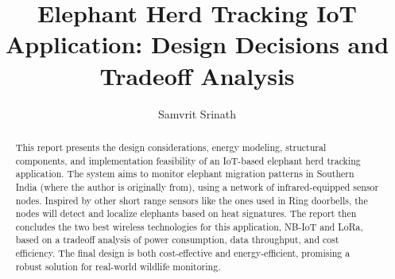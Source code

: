 \documentclass[sigconf,letterpaper,10pt,nonacm]{acmart}
\begin{document}
\title{Elephant Herd Tracking IoT Application: Design Decisions and Tradeoff Analysis}
\author{Samvrit Srinath}

\begin{abstract}
    This report presents the design considerations, energy modeling, structural components, and implementation feasibility of an IoT-based elephant herd tracking application. The system aims to monitor elephant migration patterns in Southern India (where the author is originally from), using a network of infrared-equipped sensor nodes. Inspired by other short range sensors like the ones used in Ring doorbells, the nodes will detect and localize elephants based on heat signatures. The report then concludes the two best wireless technologies for this application, NB-IoT and LoRa, based on a tradeoff analysis of power consumption, data throughput, and cost efficiency. The final design is both cost-effective and energy-efficient, promising a robust solution for real-world wildlife monitoring.
\end{abstract}

\maketitle




% 
% 









\end{document}
